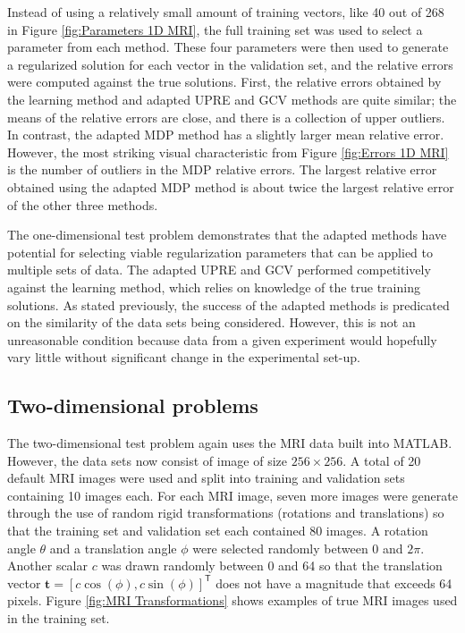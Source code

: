 \documentclass[12pt]{article}
\newcommand{\tVec}{\mathbf{t}}	%
\newcommand{\trans}[1]{{#1}^\mathsf{T}}	%
\begin{document}
\noindent Instead of using a relatively small amount of training vectors, like 40 out of 268 in Figure \ref{fig:Parameters 1D MRI}, the full training set was used to select a parameter from each method. These four parameters were then used to generate a regularized solution for each vector in the validation set, and the relative errors were computed against the true solutions. First, the relative errors obtained by the learning method and adapted UPRE and GCV methods are quite similar; the means of the relative errors are close, and there is a collection of upper outliers. In contrast, the adapted MDP method has a slightly larger mean relative error. However, the most striking visual characteristic from Figure \ref{fig:Errors 1D MRI} is the number of outliers in the MDP relative errors. The largest relative error obtained using the adapted MDP method is about twice the largest relative error of the other three methods. \par 
The one-dimensional test problem demonstrates that the adapted methods have potential for selecting viable regularization parameters that can be applied to multiple sets of data. The adapted UPRE and GCV performed competitively against the learning method, which relies on knowledge of the true training solutions. As stated previously, the success of the adapted methods is predicated on the similarity of the data sets being considered. However, this is not an unreasonable condition because data from a given experiment would hopefully vary little without significant change in the experimental set-up.

\subsection{Two-dimensional problems} \label{sec:2D}
The two-dimensional test problem again uses the MRI data built into MATLAB. However, the data sets now consist of image of size $256 \times 256$. A total of 20 default MRI images were used and split into training and validation sets containing 10 images each. For each MRI image, seven more images were generate through the use of random rigid transformations (rotations and translations) so that the training set and validation set each contained 80 images. A rotation angle $\theta$ and a translation angle $\phi$ were selected randomly between 0 and $2\pi$. Another scalar $c$ was drawn randomly between 0 and 64 so that the translation vector $\tVec = \trans{[c\cos(\phi),c\sin(\phi)]}$ does not have a magnitude that exceeds 64 pixels. Figure \ref{fig:MRI Transformations} shows examples of true MRI images used in the training set. 
\end{document}
